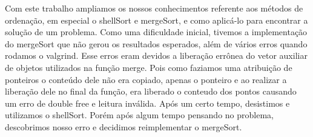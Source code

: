 \documentclass{article}
\begin{document}
Com este trabalho ampliamos os nossos conhecimentos referente 
aos métodos de ordenação, em especial o shellSort e mergeSort, e como aplicá-lo
para encontrar a solução de um problema. 
Como uma dificuldade inicial, tivemos a implementação do mergeSort 
que não gerou os resultados esperados, além de vários erros quando 
rodamos o valgrind. Esse erros eram devidos a liberação errônea do vetor auxiliar
de objetos utilizados na função merge. Pois como faziamos uma atribuição de ponteiros
o conteúdo dele não era copiado, apenas o ponteiro e ao realizar a liberação dele
no final da função, era liberado o conteudo dos pontos causando um erro de double free e leitura inválida.
Após um certo tempo, desistimos e utilizamos o shellSort. Porém após algum
tempo pensando no problema, descobrimos nosso erro e decidimos reimplementar o mergeSort.
\end{document}

